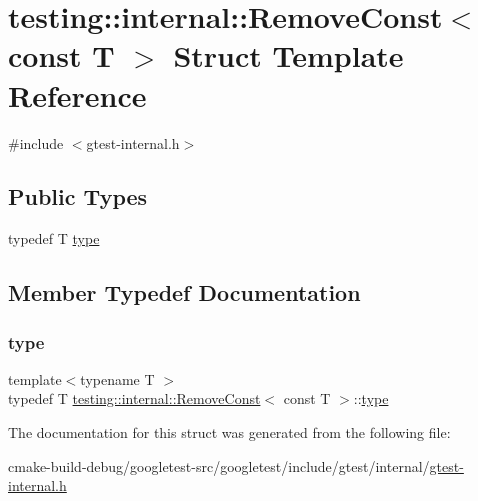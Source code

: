 \hypertarget{structtesting_1_1internal_1_1RemoveConst_3_01const_01T_01_4}{}\section{testing\+::internal\+::Remove\+Const$<$ const T $>$ Struct Template Reference}
\label{structtesting_1_1internal_1_1RemoveConst_3_01const_01T_01_4}


{\ttfamily \#include $<$gtest-\/internal.\+h$>$}

\subsection*{Public Types}
\begin{DoxyCompactItemize}
\item 
typedef T \mbox{\hyperlink{structtesting_1_1internal_1_1RemoveConst_3_01const_01T_01_4_ac88c6824d228ab05091e5a4f1c1a95fc}{type}}
\end{DoxyCompactItemize}


\subsection{Member Typedef Documentation}
\mbox{\label{structtesting_1_1internal_1_1RemoveConst_3_01const_01T_01_4_ac88c6824d228ab05091e5a4f1c1a95fc}} 
\subsubsection{\texorpdfstring{type}{type}}
{\footnotesize\ttfamily template$<$typename T $>$ \\
typedef T \mbox{\hyperlink{structtesting_1_1internal_1_1RemoveConst}{testing\+::internal\+::\+Remove\+Const}}$<$ const T $>$\+::\mbox{\hyperlink{structtesting_1_1internal_1_1RemoveConst_3_01const_01T_01_4_ac88c6824d228ab05091e5a4f1c1a95fc}{type}}}



The documentation for this struct was generated from the following file\+:\begin{DoxyCompactItemize}
\item 
cmake-\/build-\/debug/googletest-\/src/googletest/include/gtest/internal/\mbox{\hyperlink{gtest-internal_8h}{gtest-\/internal.\+h}}\end{DoxyCompactItemize}
